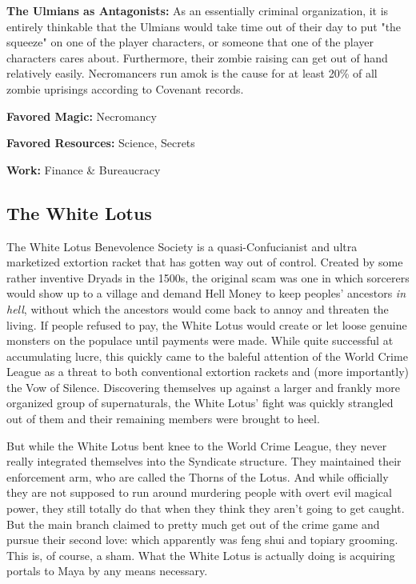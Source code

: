 \textbf{The Ulmians as Antagonists:} As an essentially criminal organization, it is entirely thinkable that the Ulmians would take time out of their day to put "the squeeze" on one of the player characters, or someone that one of the player characters cares about. Furthermore, their zombie raising can get out of hand relatively easily. Necromancers run amok is the cause for at least 20\% of all zombie uprisings according to Covenant records.

\textbf{Favored Magic:} Necromancy

\textbf{Favored Resources:} Science, Secrets

\textbf{Work:} Finance \& Bureaucracy

\subsection{The White Lotus} 

The White Lotus Benevolence Society is a quasi-Confucianist and ultra marketized extortion racket that has gotten way out of control. Created by some rather inventive Dryads in the 1500s, the original scam was one in which sorcerers would show up to a village and demand Hell Money to keep peoples' ancestors \textit{in hell}, without which the ancestors would come back to annoy and threaten the living. If people refused to pay, the White Lotus would create or let loose genuine monsters on the populace until payments were made. While quite successful at accumulating lucre, this quickly came to the baleful attention of the World Crime League as a threat to both conventional extortion rackets and (more importantly) the Vow of Silence. Discovering themselves up against a larger and frankly more organized group of supernaturals, the White Lotus' fight was quickly strangled out of them and their remaining members were brought to heel.

But while the White Lotus bent knee to the World Crime League, they never really integrated themselves into the Syndicate structure. They maintained their enforcement arm, who are called the Thorns of the Lotus. And while officially they are not supposed to run around murdering people with overt evil magical power, they still totally do that when they think they aren't going to get caught. But the main branch claimed to pretty much get out of the crime game and pursue their second love: which apparently was feng shui and topiary grooming. This is, of course, a sham. What the White Lotus is actually doing is acquiring portals to Maya by any means necessary.

